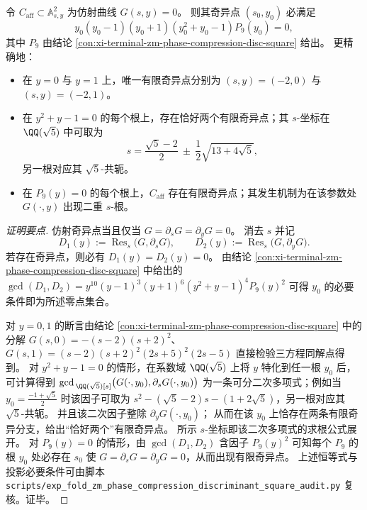 \begin{conclusion}[平面相位压缩模型的奇异纤维投影：由 \texorpdfstring{$y=-1$}{y=-1}、黄金共轭与 \texorpdfstring{$P_9$}{P9} 控制]\label{con:xi-terminal-zm-phase-compression-affine-singular-fibers}
令 \(C_{\mathrm{aff}}\subset\mathbb A^2_{s,y}\) 为仿射曲线 \(G(s,y)=0\)。
则其奇异点 \((s_0,y_0)\) 必满足
\[
y_0(y_0-1)(y_0+1)(y_0^{2}+y_0-1)P_{9}(y_0)=0,
\]
其中 \(P_9\) 由结论 \ref{con:xi-terminal-zm-phase-compression-disc-square} 给出。
更精确地：
\begin{itemize}
  \item 在 \(y=0\) 与 \(y=1\) 上，唯一有限奇异点分别为 \((s,y)=(-2,0)\) 与 \((s,y)=(-2,1)\)。
  \item 在 \(y^{2}+y-1=0\) 的每个根上，存在恰好两个有限奇异点；其 \(s\)-坐标在 \(\QQ(\sqrt5)\) 中可取为
  \[
  s=\frac{\sqrt5-2}{2}\ \pm\ \frac12\sqrt{13+4\sqrt5},
  \]
  另一根对应其 \(\sqrt5\)-共轭。
  \item 在 \(P_9(y)=0\) 的每个根上，\(C_{\mathrm{aff}}\) 存在有限奇异点；其发生机制为在该参数处 \(G(\cdot,y)\) 出现二重 \(s\)-根。
\end{itemize}
\end{conclusion}
\begin{proof}[证明要点]
仿射奇异点当且仅当 \(G=\partial_sG=\partial_yG=0\)。
消去 \(s\) 并记
\[
D_1(y):=\operatorname{Res}_{s}\bigl(G,\partial_sG\bigr),\qquad
D_2(y):=\operatorname{Res}_{s}\bigl(G,\partial_yG\bigr).
\]
若存在奇异点，则必有 \(D_1(y)=D_2(y)=0\)。
由结论 \ref{con:xi-terminal-zm-phase-compression-disc-square} 中给出的
\(
\gcd(D_1,D_2)=y^{10}(y-1)^3(y+1)^6(y^2+y-1)^4P_9(y)^2
\)
可得 \(y_0\) 的必要条件即为所述零点集合。
\par
对 \(y=0,1\) 的断言由结论 \ref{con:xi-terminal-zm-phase-compression-disc-square} 中的分解
\(
G(s,0)=-(s-2)(s+2)^2
\)、\(
G(s,1)=(s-2)(s+2)^2(2s+5)^2(2s-5)
\)
直接检验三方程同解点得到。
对 \(y^{2}+y-1=0\) 的情形，在系数域 \(\QQ(\sqrt5)\) 上将 \(y\) 特化到任一根 \(y_0\) 后，
可计算得到
\(
\gcd_{\,\QQ(\sqrt5)[s]}\bigl(G(\cdot,y_0),\partial_sG(\cdot,y_0)\bigr)
\)
为一条可分二次多项式；例如当 \(y_0=\frac{-1+\sqrt5}{2}\) 时该因子可取为
\(
s^{2}-(\sqrt5-2)s-(1+2\sqrt5)
\)，另一根对应其 \(\sqrt5\)-共轭。
并且该二次因子整除 \(\partial_yG(\cdot,y_0)\)；
从而在该 \(y_0\) 上恰存在两条有限奇异分支，给出“恰好两个”有限奇异点。
所示 \(s\)-坐标即该二次多项式的求根公式展开。
对 \(P_9(y)=0\) 的情形，由 \(\gcd(D_1,D_2)\) 含因子 \(P_9(y)^2\) 可知每个 \(P_9\) 的根 \(y_0\) 处必存在 \(s_0\) 使 \(G=\partial_sG=\partial_yG=0\)，从而出现有限奇异点。
上述恒等式与投影必要条件可由脚本 \texttt{scripts/exp\_fold\_zm\_phase\_compression\_discriminant\_square\_audit.py} 复核。证毕。
\end{proof}

